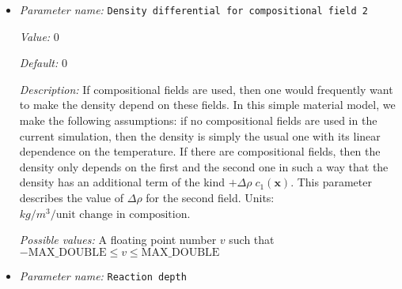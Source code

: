 \begin{itemize}
{\it Value:} 0


{\it Default:} 0


{\it Description:} If compositional fields are used, then one would frequently want to make the density depend on these fields. In this simple material model, we make the following assumptions: if no compositional fields are used in the current simulation, then the density is simply the usual one with its linear dependence on the temperature. If there are compositional fields, then the density only depends on the first and the second one in such a way that the density has an additional term of the kind $+\Delta \rho \; c_1(\mathbf x)$. This parameter describes the value of $\Delta \rho$ for the first field. Units: $kg/m^3/\textrm{unit change in composition}$.


{\it Possible values:} A floating point number $v$ such that $-\text{MAX\_DOUBLE} \leq v \leq \text{MAX\_DOUBLE}$
\item {\it Parameter name:} {\tt Density differential for compositional field 2}
\label{parameters:Material model/Composition reaction model/Density differential for compositional field 2}
\label{parameters:Material_20model/Composition_20reaction_20model/Density_20differential_20for_20compositional_20field_202}


{\it Value:} 0


{\it Default:} 0


{\it Description:} If compositional fields are used, then one would frequently want to make the density depend on these fields. In this simple material model, we make the following assumptions: if no compositional fields are used in the current simulation, then the density is simply the usual one with its linear dependence on the temperature. If there are compositional fields, then the density only depends on the first and the second one in such a way that the density has an additional term of the kind $+\Delta \rho \; c_1(\mathbf x)$. This parameter describes the value of $\Delta \rho$ for the second field. Units: $kg/m^3/\textrm{unit change in composition}$.


{\it Possible values:} A floating point number $v$ such that $-\text{MAX\_DOUBLE} \leq v \leq \text{MAX\_DOUBLE}$
\item {\it Parameter name:} {\tt Reaction depth}
\label{parameters:Material model/Composition reaction model/Reaction depth}
\label{parameters:Material_20model/Composition_20reaction_20model/Reaction_20depth}



\end{itemize}
